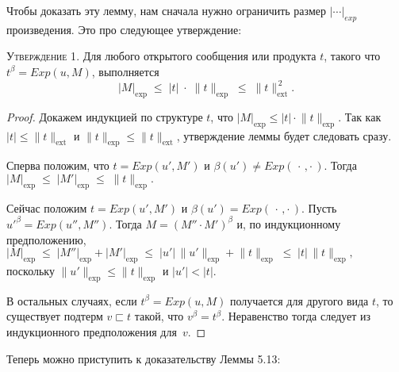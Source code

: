 Чтобы доказать эту лемму, нам сначала нужно ограничить размер $\lvert\cdots\rvert_{exp}$
произведения. Это про следующее утверждение:

\textsc{Утверждение 1}. Для любого открытого сообщения или продукта $t$, такого что
$t^{\beta}= Exp(u,M)$, выполняется
\[
   \lvert M\rvert_{\exp}
   \;\le\;
   \lvert t\rvert\;\cdot\;\lVert t\rVert_{\exp}
   \;\le\;
   \lVert t\rVert_{\text{ext}}^{\,2}.
\]

\begin{proof}
Докажем индукцией по структуре $t$, что
$\lvert M\rvert_{\exp}\le\lvert t\rvert\cdot\lVert t\rVert_{\exp}$.
Так как $\lvert t\rvert\le\lVert t\rVert_{\text{ext}}$ и
$\lVert t\rVert_{\exp}\le\lVert t\rVert_{\text{ext}}$,
утверждение леммы будет следовать сразу.

\smallskip
Сперва положим, что $t= Exp(u',M')$ и $\beta(u')\neq Exp(\,\cdot\,,\cdot\,)$.
Тогда
\(
   \lvert M\rvert_{\exp}
   \;\le\;
   \lvert M'\rvert_{\exp}
   \;\le\;
   \lVert t\rVert_{\exp}.
\)

\smallskip
Сейчас положим $t= Exp(u',M')$ и $\beta(u')= Exp(\,\cdot\,,\cdot\,)$.
Пусть $u'^{\beta}= Exp(u'',M'')$.
Тогда $M=(M''\!\cdot M')^{\beta}$ и, по индукционному предположению,
\(
   \lvert M\rvert_{\exp}
      \;\le\;
      \lvert M''\rvert_{\exp}+\lvert M'\rvert_{\exp}
      \;\le\;
      \lvert u'\rvert\,\lVert u'\rVert_{\exp}
        +\lVert t\rVert_{\exp}
      \;\le\;
      \lvert t\rvert\,\lVert t\rVert_{\exp},
\)
поскольку $\lVert u'\rVert_{\exp}\le\lVert t\rVert_{\exp}$
и $\lvert u'\rvert<\lvert t\rvert$.

\smallskip
В остальных случаях, если $t^{\beta}= Exp(u,M)$ получается для другого вида $t$,
то существует подтерм $v\sqsubset t$ такой, что $v^{\beta}=t^{\beta}$.
Неравенство тогда следует из индукционного предположения для~$v$.
\end{proof}

Теперь можно приступить к доказательству Леммы 5.13:

